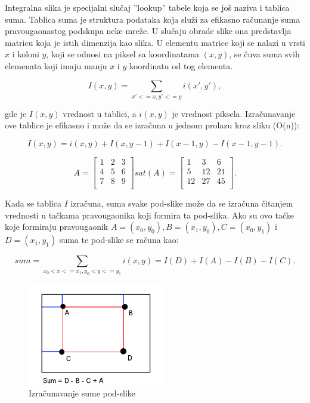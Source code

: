 \documentclass[a4paper,12pt,titlepage]{article}
\begin{document}
Integralna slika je specijalni slučaj ''lookup'' tabele koja se još naziva i tablica suma. Tablica suma je struktura podataka koja služi za efikasno računanje suma pravougaonastog podskupa neke mreže. U slučaju obrade slike ona predstavlja matricu koja je istih dimenzija kao slika. U elementu matrice koji se nalazi u vrsti $x$ i koloni $y$, koji se odnosi na piksel sa koordinatama $(x, y)$, se čuva suma svih elemenata koji imaju manju $x$ i $y$ koordinatu od tog elementa. 

\begin{equation}\label{eq:gf17}
I(x, y) = \sum_{x' <= x, y' <= y} i(x', y'),
\end{equation}

gde je $I(x, y)$ vrednost u tablici, a $i(x, y)$ je vrednost piksela. Izračunavanje ove tablice je efikasno i može da se izračuna u jednom prolazu kroz sliku (O(n)):

\begin{equation}\label{eq:gf18}
I(x, y) = i(x, y) + I(x, y - 1) + I(x - 1, y) - I(x - 1, y - 1).
\end{equation}

\begin{equation}\label{eq:gf18}
A
=
\begin{bmatrix}
1 & 2 & 3 \\
4 & 5 & 6 \\
7 & 8 & 9 \\
\end{bmatrix}
sat(A)
=
\begin{bmatrix}
1 & 3 & 6 \\
5 & 12 & 21 \\
12 & 27 & 45 \\
\end{bmatrix}
.\end{equation}

Kada se tablica $I$ izračuna, suma svake pod-slike može da se izračuna čitanjem vrednosti u tačkama pravougaonika koji formira ta pod-slika. Ako su ovo tačke koje formiraju pravougaonik $A = (x_0, y_0), B = (x_1, y_0), C = (x_0, y_1)$ i $D = (x_1, y_1)$ suma te pod-slike se računa kao:

\begin{equation}\label{eq:gf19}
sum = \sum_{x_0 < x <= x_1, y_0 < y <= y_1} i(x, y) = I(D) + I(A) - I(B) - I(C).
\end{equation} 

\begin{figure}[ht!]
\centering
\includegraphics[width=60mm]{img/sat.png}
\caption{Izračunavanje sume pod-slike}
\label{overflow}
\end{figure}
\end{document}
